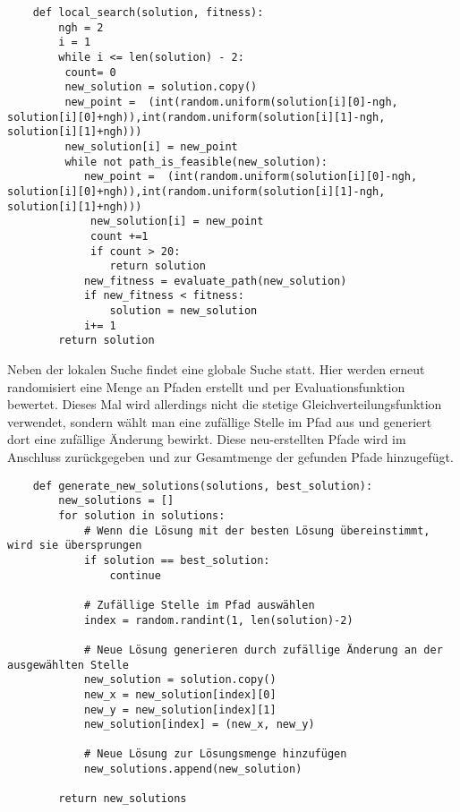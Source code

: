 \begin{verbatim}
    def local_search(solution, fitness):
        ngh = 2
        i = 1
        while i <= len(solution) - 2:
         count= 0
         new_solution = solution.copy()
         new_point =  (int(random.uniform(solution[i][0]-ngh, solution[i][0]+ngh)),int(random.uniform(solution[i][1]-ngh, solution[i][1]+ngh)))
         new_solution[i] = new_point
         while not path_is_feasible(new_solution):
            new_point =  (int(random.uniform(solution[i][0]-ngh, solution[i][0]+ngh)),int(random.uniform(solution[i][1]-ngh, solution[i][1]+ngh)))
             new_solution[i] = new_point 
             count +=1
             if count > 20:
                return solution
            new_fitness = evaluate_path(new_solution)
            if new_fitness < fitness:
                solution = new_solution
            i+= 1
        return solution
\end{verbatim}
\vspace*{-3mm}
\vspace*{3mm}

Neben der lokalen Suche findet eine globale Suche statt. Hier werden erneut randomisiert eine Menge an Pfaden erstellt und per Evaluationsfunktion bewertet. Dieses Mal wird allerdings nicht die stetige Gleichverteilungsfunktion verwendet, sondern wählt man eine zufällige Stelle im Pfad aus und generiert dort eine zufällige Änderung bewirkt. Diese neu-erstellten Pfade wird im Anschluss zurückgegeben und zur Gesamtmenge der gefunden Pfade hinzugefügt.

\begin{verbatim}
    def generate_new_solutions(solutions, best_solution):
        new_solutions = []
        for solution in solutions:
            # Wenn die Lösung mit der besten Lösung übereinstimmt, wird sie übersprungen
            if solution == best_solution:
                continue
            
            # Zufällige Stelle im Pfad auswählen
            index = random.randint(1, len(solution)-2)
            
            # Neue Lösung generieren durch zufällige Änderung an der ausgewählten Stelle
            new_solution = solution.copy()
            new_x = new_solution[index][0] 
            new_y = new_solution[index][1] 
            new_solution[index] = (new_x, new_y)
            
            # Neue Lösung zur Lösungsmenge hinzufügen
            new_solutions.append(new_solution)
        
        return new_solutions
\end{verbatim}
\vspace*{-3mm}
\vspace*{3mm}

